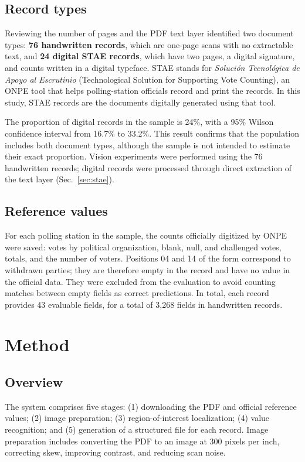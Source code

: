 \documentclass[conference]{IEEEtran}
\begin{document}
\subsection{Record types}
Reviewing the number of pages and the PDF text layer identified two document
types: \textbf{76 handwritten records}, which are one-page scans with no
extractable text, and \textbf{24 digital STAE records}, which have two pages, a
digital signature, and counts written in a digital typeface. STAE stands for
\emph{Soluci\'on Tecnol\'ogica de Apoyo al Escrutinio} (Technological Solution
for Supporting Vote Counting), an ONPE tool that helps polling-station officials
record and print the records. In this study, STAE records are the documents
digitally generated using that tool.

The proportion of digital records in the sample is 24\%, with a 95\% Wilson
confidence interval from 16.7\% to 33.2\%. This result confirms that the
population includes both document types, although the sample is not intended to
estimate their exact proportion. Vision experiments were performed using the 76
handwritten records; digital records were processed through direct extraction of
the text layer (Sec.~\ref{sec:stae}).

\subsection{Reference values}
For each polling station in the sample, the counts officially digitized by ONPE
were saved: votes by political organization, blank, null, and challenged votes,
totals, and the number of voters. Positions 04 and 14 of the form correspond to
withdrawn parties; they are therefore empty in the record and have no value in
the official data. They were excluded from the evaluation to avoid counting
matches between empty fields as correct predictions. In total, each record
provides 43 evaluable fields, for a total of 3,268 fields in handwritten records.

\section{Method}
\subsection{Overview}
The system comprises five stages: (1) downloading the PDF and official reference
values; (2) image preparation; (3) region-of-interest localization; (4) value
recognition; and (5) generation of a structured file for each record. Image
preparation includes converting the PDF to an image at 300 pixels per inch,
correcting skew, improving contrast, and reducing scan noise.
\end{document}

